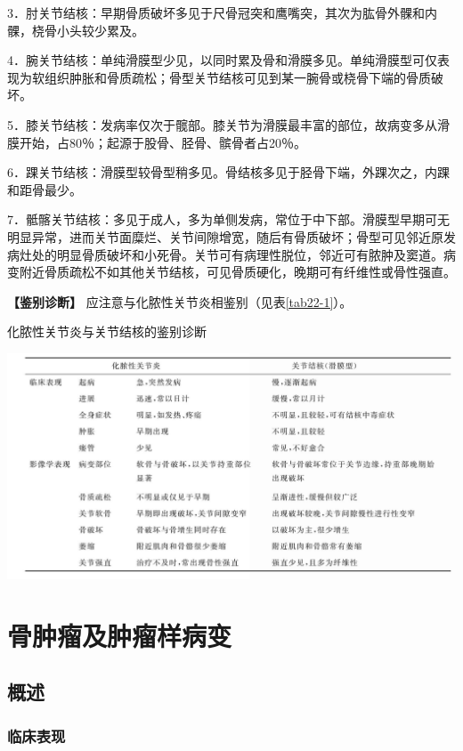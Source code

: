 3．肘关节结核：早期骨质破坏多见于尺骨冠突和鹰嘴突，其次为肱骨外髁和内髁，桡骨小头较少累及。

4．腕关节结核：单纯滑膜型少见，以同时累及骨和滑膜多见。单纯滑膜型可仅表现为软组织肿胀和骨质疏松；骨型关节结核可见到某一腕骨或桡骨下端的骨质破坏。

5．膝关节结核：发病率仅次于髋部。膝关节为滑膜最丰富的部位，故病变多从滑膜开始，占80％；起源于股骨、胫骨、髌骨者占20％。

6．踝关节结核：滑膜型较骨型稍多见。骨结核多见于胫骨下端，外踝次之，内踝和距骨最少。

7．骶髂关节结核：多见于成人，多为单侧发病，常位于中下部。滑膜型早期可无明显异常，进而关节面糜烂、关节间隙增宽，随后有骨质破坏；骨型可见邻近原发病灶处的明显骨质破坏和小死骨。关节可有病理性脱位，邻近可有脓肿及窦道。病变附近骨质疏松不如其他关节结核，可见骨质硬化，晚期可有纤维性或骨性强直。

\textbf{【鉴别诊断】} 应注意与化脓性关节炎相鉴别（见表\ref{tab22-1}）。

\begin{table}[htbp]
\centering
\caption{化脓性关节炎与关节结核的鉴别诊断}
\label{tab22-1}
\includegraphics[width=\textwidth,height=\textheight,keepaspectratio]{./images/Image00433.jpg}
\end{table}

\section{骨肿瘤及肿瘤样病变}

\subsection{概述}

\subsubsection{临床表现}

